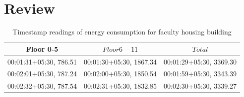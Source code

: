 \documentclass{acm_proc_article-sp}
\begin{document}
\section{Review}
\label{sec:review}

\begin{table}[htdp]
\begin{center}
\begin{tabular}{| c | c | c |}
\hline
Floor 0-5 & $Floor 6 -11$ & $Total$ \\
\hline
00:01:31+05:30, 786.51 & 00:01:30+05:30, 1867.34 & 00:01:29+05:30, 3369.30 \\
00:02:01+05:30, 787.24 & 00:02:00+05:30, 1850.54 & 00:01:59+05:30, 3343.39  \\
00:02:32+05:30, 787.54 & 00:02:31+05:30, 1832.85 & 00:02:30+05:30, 3339.27 \\ 
\hline
\end{tabular}
\end{center}
\caption{Timestamp readings of energy consumption for faculty housing building}
\label{table:timestamp}
\end{table}
\end{document}
